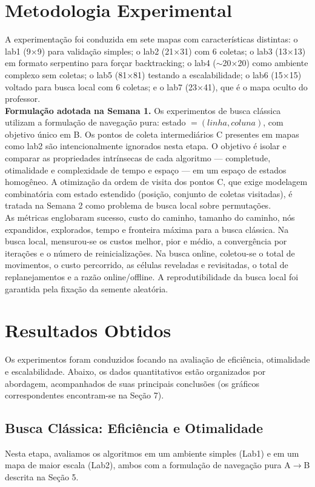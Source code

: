 \documentclass[12pt,a4paper]{article}
\begin{document}
\section{Metodologia Experimental}
A experimentação foi conduzida em sete mapas com características distintas: o lab1 (9×9) para validação simples; o lab2 (21×31) com 6 coletas; o lab3 (13×13) em formato serpentino para forçar backtracking; o lab4 ($\sim$20×20) como ambiente complexo sem coletas; o lab5 (81×81) testando a escalabilidade; o lab6 (15×15) voltado para busca local com 6 coletas; e o lab7 (23×41), que é o mapa oculto do professor.
\\

\textbf{Formulação adotada na Semana 1.} Os experimentos de busca clássica utilizam a formulação de navegação pura: estado $= (linha, coluna)$, com objetivo único em B. Os pontos de coleta intermediários C presentes em mapas como lab2 são intencionalmente ignorados nesta etapa. O objetivo é isolar e comparar as propriedades intrínsecas de cada algoritmo — completude, otimalidade e complexidade de tempo e espaço — em um espaço de estados homogêneo. A otimização da ordem de visita dos pontos C, que exige modelagem combinatória com estado estendido (posição, conjunto de coletas visitadas), é tratada na Semana 2 como problema de busca local sobre permutações.
\\

As métricas englobaram sucesso, custo do caminho, tamanho do caminho, nós expandidos, explorados, tempo e fronteira máxima para a busca clássica. Na busca local, mensurou-se os custos melhor, pior e médio, a convergência por iterações e o número de reinicializações. Na busca online, coletou-se o total de movimentos, o custo percorrido, as células reveladas e revisitadas, o total de replanejamentos e a razão online/offline. A reprodutibilidade da busca local foi garantida pela fixação da semente aleatória.

\section{Resultados Obtidos}
Os experimentos foram conduzidos focando na avaliação de eficiência, otimalidade e escalabilidade. Abaixo, os dados quantitativos estão organizados por abordagem, acompanhados de suas principais conclusões (os gráficos correspondentes encontram-se na Seção 7).

\subsection{Busca Clássica: Eficiência e Otimalidade}
Nesta etapa, avaliamos os algoritmos em um ambiente simples (Lab1) e em um mapa de maior escala (Lab2), ambos com a formulação de navegação pura A$\rightarrow$B descrita na Seção 5.
\end{document}
